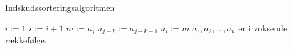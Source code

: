 \begin{algorithm}[H]
\caption{Indskudssorteringsalgoritmen}
\begin{algorithmic}[1]

\EndProcedure
{}
	\State $i:=1$
    		\State $i:=i+1$
    	\EndWhile
    	\State $m:=a_{j}$
    		\State $a_{j-k}:=a_{j-k-1}$
    	\EndFor
    	\State $a_{i}:=m$
\EndFor
\State $a_{1},a_{2},\dotsc,a_{n}$ er i voksende rækkefølge. 

\end{algorithmic}
\end{algorithm}

